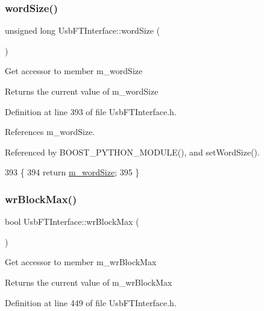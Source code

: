 \subsubsection{\texorpdfstring{word\+Size()}{wordSize()}}
{\footnotesize\ttfamily unsigned long Usb\+F\+T\+Interface\+::word\+Size (\begin{DoxyParamCaption}{ }\end{DoxyParamCaption})\hspace{0.3cm}{\ttfamily [inline]}}

Get accessor to member m\+\_\+word\+Size \begin{DoxyReturn}{Returns}
the current value of m\+\_\+word\+Size 
\end{DoxyReturn}


Definition at line 393 of file Usb\+F\+T\+Interface.\+h.



References m\+\_\+word\+Size.



Referenced by B\+O\+O\+S\+T\+\_\+\+P\+Y\+T\+H\+O\+N\+\_\+\+M\+O\+D\+U\+L\+E(), and set\+Word\+Size().


\begin{DoxyCode}
393                             \{
394     \textcolor{keywordflow}{return} \hyperlink{classUsbFTInterface_a05ccc38a60c4b921b835238b604b38d8}{m\_wordSize};
395   \}  
\end{DoxyCode}
\mbox{\label{classUsbFTInterface_ad73d2d990fdda96ee53566daaeb73abc}} 
\subsubsection{\texorpdfstring{wr\+Block\+Max()}{wrBlockMax()}}
{\footnotesize\ttfamily bool Usb\+F\+T\+Interface\+::wr\+Block\+Max (\begin{DoxyParamCaption}{ }\end{DoxyParamCaption})\hspace{0.3cm}{\ttfamily [inline]}}

Get accessor to member m\+\_\+wr\+Block\+Max \begin{DoxyReturn}{Returns}
the current value of m\+\_\+wr\+Block\+Max 
\end{DoxyReturn}


Definition at line 449 of file Usb\+F\+T\+Interface.\+h.



